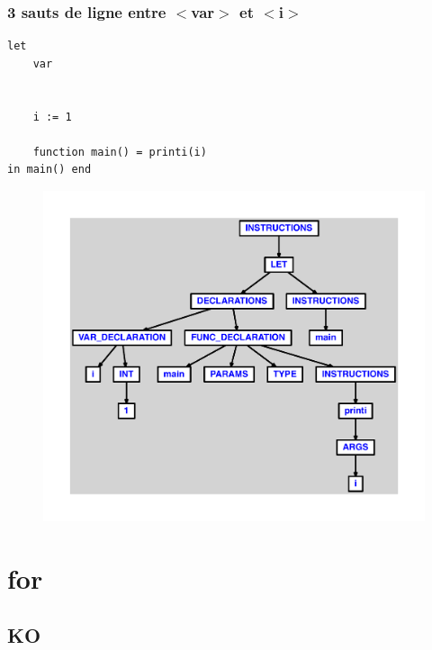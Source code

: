 \documentclass{article}
\begin{document}
\subsubsection{3 sauts de ligne entre $ < $var$ > $ et $ < $i$ > $}
\begin{lstlisting}
let
	var


	i := 1

	function main() = printi(i)
in main() end
\end{lstlisting}
\newpage
\begin{figure}[H]
\centering
\includegraphics[max width=\textwidth]{ast/ast_191.pdf}
\end{figure}
\newpage
\section{for}
\subsection{KO}
\end{document}
